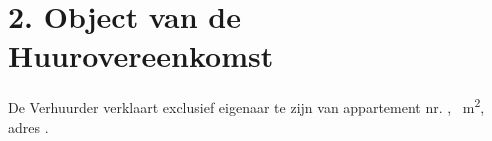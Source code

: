 \section*{2. Object van de Huurovereenkomst}
De Verhuurder verklaart exclusief eigenaar te zijn van appartement nr. \Propunitnumber, \Propaream~m\textsuperscript{2}, adres \Propaddress.
